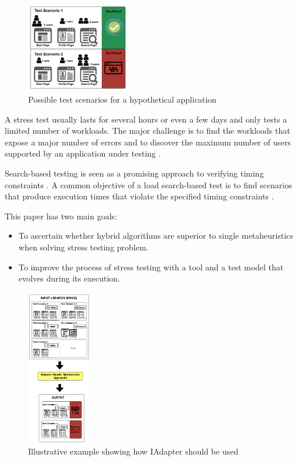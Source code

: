 \begin{figure}[ht]
\centering
\includegraphics[width=0.4\textwidth]{./images/diagram.png}
\caption{Possible test scenarios for a hypothetical application}
\label{fig:example}
\end{figure}

A stress test usually lasts for several hours or even a few days and only tests a limited number of workloads. The major challenge is to find the workloads that expose a major number of errors and to discover the maximum number of users supported by an application under testing \cite{Barna2011}. 

Search-based testing is seen as a promising approach to verifying timing constraints \cite{Afzal2009a}. A common objective of a load search-based test is to find  scenarios that produce execution times that violate the specified timing constraints \cite{Sullivan}. 

This paper has two main goals:

\begin{itemize}
\item  To ascertain whether hybrid algorithms are superior to single metaheuristics when solving stress testing problem.
\item To improve the process of stress testing with a tool and a test model that evolves during its execution.
\end{itemize}


\begin{figure}[ht]
\centering
\includegraphics[width=0.25\textwidth]{./images/solution.png}
\caption{Illustrative example showing how IAdapter should be used}
\label{fig:solution}
\end{figure}



